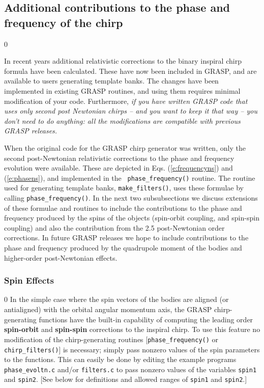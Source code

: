 \subsection{Additional contributions to the phase and frequency of the chirp}
\label{ss:additional}
\setcounter{equation}0

In recent years additional relativistic corrections to the
binary inspiral chirp formula have been calculated. 
These have now been
included in GRASP, and are available to users generating template banks.  
The changes have been implemented in existing GRASP routines, and
using  them requires minimal modification of your code.
Furthermore, {\it if you have written GRASP code that uses
only second post Newtonian chirps -- and you want to
keep it that way  -- you don't need to do anything: all the
modifications are compatible with previous GRASP releases.}

When the original code for the GRASP chirp generator was
written, only the second post-Newtonian relativistic
corrections to the phase  and frequency evolution were
available.  These are depicted in Eqs. (\ref{e:frequencyns})
and (\ref{e:phasens}), and implemented in the {\tt
phase\_frequency()}  routine.  The routine used for
generating template banks, {\tt make\_filters()}, uses these
formulae by calling {\tt phase\_frequency()}.  In the next
two subsubsections we discuss extensions of these formulae
and routines to include the contributions to the phase and
frequency produced by the spins of the objects (spin-orbit
coupling, and spin-spin coupling) and also the contribution
from the 2.5 post-Newtonian order corrections.
In future GRASP releases  we hope to include contributions
to the phase and frequency produced by the quadrupole moment
of the bodies and higher-order post-Newtonian effects.

\subsubsection{Spin Effects}
\label{sss:spin}
\setcounter{equation}0
In the simple case where the spin vectors of the bodies
are aligned (or antialigned) with the orbital angular momentum
axis, the GRASP chirp-generating
functions have the built-in capability of computing the leading order
{\bf spin-orbit} and {\bf spin-spin} corrections to the
inspiral chirp.
To use this feature no modification of the chirp-generating routines 
[{\tt phase\_frequency()} or {\tt chirp\_filters()}] is necessary;
simply pass nonzero values of the spin parameters to the functions.
This can easily be done by editing the example programs 
{\tt phase\_evoltn.c} and/or {\tt filters.c} to
pass nonzero values of the variables {\tt spin1} and {\tt spin2}.
[See below for definitions and allowed ranges of {\tt spin1} and {\tt spin2}.]

